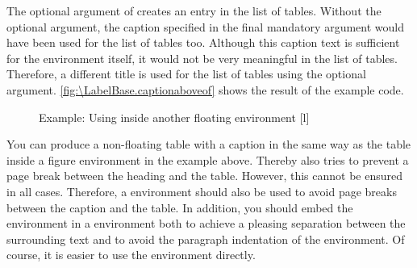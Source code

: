 \begin{Example}
  The optional argument of  creates an entry in the
  list of tables. Without the optional argument, the caption specified in the
  final mandatory argument would have been used for the list of tables too.
  Although this caption text is sufficient for the environment itself, it
  would not be very meaningful in the list of tables. Therefore, a different
  title is used for the list of tables using the optional argument.
  \autoref{fig:\LabelBase.captionaboveof} shows the result of the example code.%
\begin{figure}
  \setcapindent{0pt}%
  \begin{captionbeside}
    {Example: Using  inside another floating
      environment\label{fig:\LabelBase.captionaboveof}}
    [l]
  \begin{minipage}[b]{.66\linewidth}%
  \end{minipage}%
  \end{captionbeside}%
\end{figure}%
\end{Example}%
You can produce a non-floating table with a caption in the same way as the
table inside a figure environment in the example
above. Thereby  also tries to prevent a page break between
the heading and the table. However, this cannot be ensured in all
cases. Therefore, a  environment should also be used to
avoid page breaks between the caption and the table. In addition, you should
embed the  environment in a 
environment both to achieve a pleasing separation between the surrounding text
and to avoid the paragraph indentation of the 
environment. Of course, it is easier to use the environment
 directly.%
\EndIndexGroup


